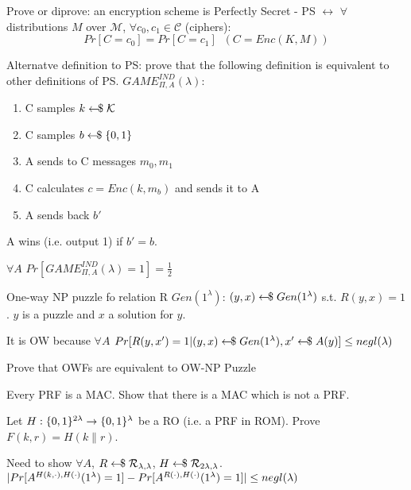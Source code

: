 \documentclass{exam}
\begin{document}
\begin{questions}
    \question
        Prove or diprove: an encryption scheme is Perfectly Secret - PS $\leftrightarrow$ $\forall$distributions $M$ over $\mathcal{M}$, $\forall c_0, c_1 \in \mathcal{C}$ (ciphers):
        \[ Pr[C=c_0] = Pr[C = c_1] \;\; (C=Enc(K,M)) \]
    \vspace{0.4cm}
    
    \question
        Alternatve definition to PS: prove that the following definition is equivalent to other definitions of PS.\newline
        $GAME_{\Pi,A}^{IND}(\lambda)$:
        \begin{enumerate}
            \item C samples $k \leftarrow\kern-0.42em{\$} \; \mathcal{K}$
            \item C samples $b \leftarrow\kern-0.42em{\$} \; \{0,1\}$
            \item A sends to C messages $m_0,m_1$
            \item C calculates $c = Enc(k,m_b)$ and sends it to A
            \item A sends back $b'$
        \end{enumerate}
        A wins (i.e. output 1) if $b' = b$.

        $\forall A$ $Pr[GAME_{\Pi,A}^{IND}(\lambda) = 1] = \frac{1}{2}$
    \vspace{0.4cm}

    \question
        One-way NP puzzle fo relation R\newline
        $Gen(1^\lambda)$: $(y,x) \leftarrow\kern-0.42em{\$} \; Gen(1^\lambda)$ s.t. $R(y,x) = 1$.\newline
        $y$ is a puzzle and $x$ a solution for $y$.

        It is OW because $\forall A$ $Pr[R(y,x')=1 \vert (y,x) \leftarrow\kern-0.42em{\$} \; Gen(1^\lambda), x' \leftarrow\kern-0.42em{\$} \; A(y)] \leq negl(\lambda)$

        Prove that OWFs are equivalent to OW-NP Puzzle
    \vspace{0.4cm}

    \question
        Every PRF is a MAC. Show that there is a MAC which is not a PRF.
    \vspace{0.4cm}

    \question
        Let $H : \{0,1\}^{2\lambda} \rightarrow \{0,1\}^\lambda$ be a RO (i.e. a PRF in ROM). Prove $F(k,r) = H(k \|  r)$.

        Need to show $\forall A$, $R \leftarrow\kern-0.42em{\$} \; \mathcal{R_{\lambda,\lambda}}$, $H \leftarrow\kern-0.42em{\$} \; \mathcal{R}_{2\lambda,\lambda}$.\newline
        $\vert  Pr[A^{H(k,\cdot),H(\cdot)} (1^\lambda) = 1] - Pr[A^{R(\cdot),H(\cdot)} (1^\lambda) = 1] \vert \leq negl(\lambda)$


\end{questions}
\end{document}
